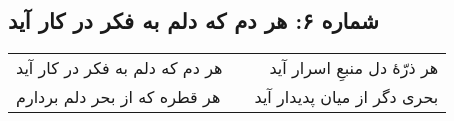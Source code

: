 \begin{center}
\section*{شماره ۶: هر دم که دلم به فکر در کار آید}
\label{sec:006}
\begin{longtable}{l p{0.5cm} r}
هر دم که دلم به فکر در کار آید
&&
هر ذرّهٔ دل منبعِ اسرار آید
\\
هر قطره که از بحر دلم بردارم
&&
بحری دگر از میان پدیدار آید
\\
\end{longtable}
\end{center}
